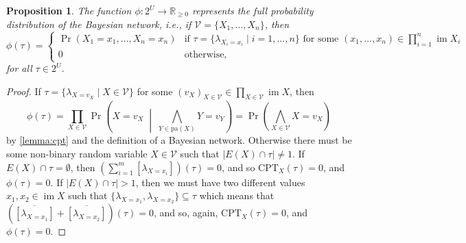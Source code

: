 \documentclass{article}
\newtheorem{proposition}{Proposition}
\theoremstyle{definition}
\theoremstyle{remark}
\DeclareMathOperator{\im}{im}
\begin{document}
{\begin{proposition} \label{lemma:full_distribution}
  The function $\phi\colon 2^U \to \mathbb{R}_{\ge 0}$ represents the full
  probability distribution of the Bayesian network, i.e., if $\mathcal{V} = \{
  X_1, \dots, X_n\}$, then
  \[
    \phi(\tau) =
    \begin{cases}
      \Pr(X_1 = x_1, \dots, X_n = x_n) & \text{if } \tau = \{ \lambda_{X_i=x_i}
      \mid i = 1, \dots, n \} \text{ for some } (x_1, \dots, x_n) \in
      \prod_{i=1}^n \im X_i \\
      0 & \text{otherwise,}
    \end{cases}
  \]
  for all $\tau \in 2^U$.
\end{proposition}
\begin{proof}
  If $\tau = \{ \lambda_{X=v_X} \mid X \in \mathcal{V} \}$ for some $(v_X)_{X
    \in \mathcal{V}} \in \prod_{X \in \mathcal{V}} \im X$, then
  \[
    \phi(\tau) = \prod_{X \in \mathcal{V}} \Pr \left( X=v_X \;\middle|\;
      \bigwedge_{Y \in \mathrm{pa}(X)} Y=v_Y \right) = \Pr \left( \bigwedge_{X
        \in \mathcal{V}} X=v_X \right)
  \]
  by \cref{lemma:cpt} and the definition of a Bayesian network. Otherwise there
  must be some non-binary random variable $X \in \mathcal{V}$ such that $|E(X)
  \cap \tau| \ne 1$. If $E(X) \cap \tau = \emptyset$, then $\left( \sum_{i=1}^m
    [\lambda_{X = x_i}] \right)(\tau) = 0$, and so $\mathrm{CPT}_X(\tau) = 0$,
  and $\phi(\tau) = 0$. If $|E(X) \cap \tau| > 1$, then we must have two
  different values $x_1, x_2 \in \im X$ such that $\{\lambda_{X=x_1},
  \lambda_{X=x_2} \} \subseteq \tau$ which means that
  $(\overline{[\lambda_{X=x_1}]} + \overline{[\lambda_{X=x_2}]})(\tau) = 0$, and
  so, again, $\mathrm{CPT}_X(\tau) = 0$, and $\phi(\tau) = 0$.
\end{proof}

}
\end{document}
